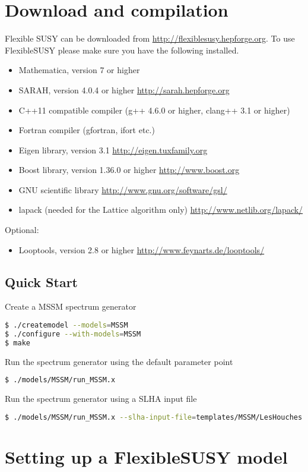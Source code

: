 \documentclass[final,3p,times,pdflatex]{elsarticle}
\begin{document}
\section{Download and compilation}
Flexible SUSY can be downloaded from \url{http://flexiblesusy.hepforge.org}.  
To use FlexibleSUSY please make sure you have the following installed.  
\begin{itemize}
\item Mathematica, version 7 or higher
\item SARAH, version 4.0.4 or higher \url{http://sarah.hepforge.org}
\item C++11 compatible compiler (g++ 4.6.0 or higher, clang++ 3.1 or
  higher)
\item Fortran compiler (gfortran, ifort etc.)
\item Eigen library, version 3.1 \url{http://eigen.tuxfamily.org}
\item Boost library, version 1.36.0 or higher
  \url{http://www.boost.org}
\item GNU scientific library \url{http://www.gnu.org/software/gsl/}
\item lapack (needed for the Lattice algorithm only)
  \url{http://www.netlib.org/lapack/}
\end{itemize}
%
Optional:
%
\begin{itemize}
\item Looptools, version 2.8 or higher
  \url{http://www.feynarts.de/looptools/}
\end{itemize}

\subsection{Quick Start}
Create a MSSM spectrum generator
  \begin{lstlisting}[language=bash]
$ ./createmodel --models=MSSM
$ ./configure --with-models=MSSM
$ make
  \end{lstlisting}
Run the spectrum generator using the default parameter point
  \begin{lstlisting}[language=bash]
$ ./models/MSSM/run_MSSM.x
  \end{lstlisting}
Run the spectrum generator using a SLHA input file
  \begin{lstlisting}[language=bash]
$ ./models/MSSM/run_MSSM.x --slha-input-file=templates/MSSM/LesHouches.in.MSSM --slha-output-file=LesHouches.out.MSSM
  \end{lstlisting}%

\section{Setting up a FlexibleSUSY model}
\end{document}
